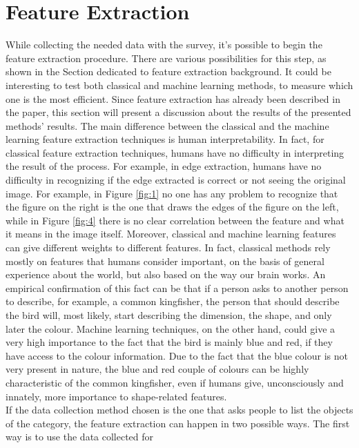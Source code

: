 \documentclass[conference]{IEEEtran}
\begin{document}
	\section{Feature Extraction\label{sec:fe}}

		\noindent While collecting the needed data with the survey, it's possible to begin the feature extraction procedure. There are various possibilities for this step, as shown in the Section dedicated to feature extraction background. 
		It could be interesting to test both classical and machine learning methods, to measure which one is the most efficient. Since feature extraction has already been described in the paper, this section will 
		present a discussion about the results of the presented methods' results. The main difference between the classical and the machine learning feature extraction techniques is human interpretability. 
		In fact, for classical feature extraction techniques, humans have no difficulty in interpreting the result of the process. For example, in edge extraction, humans have no difficulty in recognizing if the 
		edge extracted is correct or not seeing the original image. For example, in Figure \ref{fig:1} no one has any problem to recognize that the figure on the right is the one that draws the edges of the figure on the left, 
		while in Figure \ref{fig:4} there is no clear correlation between the feature and what it means in the image itself.
		Moreover, classical and machine learning features can give different weights to different features. 
		In fact, classical methods rely mostly on features that humans consider important, on the basis of general experience about the world, but also based on the way our brain works. An empirical confirmation of this fact 
		can be that if a person asks to another person to describe, for example, a common kingfisher, the person that should describe the bird will, most likely, start describing the dimension, the shape, and only 
		later the colour. Machine learning techniques, on the other hand, could give a very high importance to the fact that the bird is mainly blue and red, if they have access to the colour information. Due to the fact that 
		the blue colour is not very present in nature, the blue and red couple of colours can be highly characteristic of the common kingfisher, even if humans give, unconsciously and innately, more importance to 
		shape-related features.	\\
		If the data collection method chosen is the one that asks people to list the objects of the category, the feature extraction can happen in two possible ways. The first way is to use the data collected for 
\end{document}
